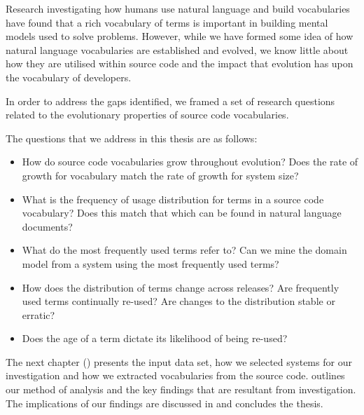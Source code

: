 Research investigating how humans use natural language and build vocabularies have found that a rich vocabulary of terms is important in building mental models used to solve problems. However, while we have formed some idea of how natural language vocabularies are established and evolved, we know little about how they are utilised within source code and the impact that evolution has upon the vocabulary of developers.

In order to address the gaps identified, we framed a set of research questions related to the evolutionary properties of source code vocabularies.

The questions that we address in this thesis are as follows:
\vspace{-0.28cm} %
\begin{itemize}
	\item How do source code vocabularies grow throughout evolution? Does the rate of growth for vocabulary match the rate of growth for system size?
	\item What is the frequency of usage distribution for terms in a source code vocabulary? Does this match that which can be found in natural language documents?
	\item What do the most frequently used terms refer to? Can we mine the domain model from a system using the most frequently used terms?
	\item How does the distribution of terms change across releases? Are frequently used terms continually re-used? Are changes to the distribution stable or erratic?
	\item Does the age of a term dictate its likelihood of being re-used?
\end{itemize}

The next chapter () presents the input data set, how we selected systems for our investigation and how we extracted vocabularies from the source code.  outlines our method of analysis and the key findings that are resultant from investigation. The implications of our findings are discussed in  and  concludes the thesis.



